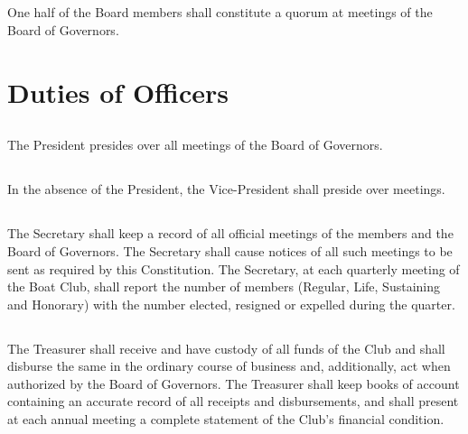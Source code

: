 \documentclass[11pt,american,letterpaper,]{constitution}
\begin{document}
\subsection[Quorum]{} 

One half of the Board members shall constitute a quorum at meetings of the Board of Governors.

\section{Duties of Officers}

\subsection[President]{} 

The President presides over all meetings of the Board of Governors.

\subsection[Vice President]{} 

In the absence of the President, the Vice-President shall preside over meetings.

\subsection[Secretary]{} 

The Secretary shall keep a record of all official meetings of the members and the Board of Governors. The Secretary shall cause notices of all such meetings to be sent as required by this Constitution. The Secretary, at each quarterly meeting of the Boat Club, shall report the number of members (Regular, Life, Sustaining and Honorary) with the number elected, resigned or expelled during the quarter.

\subsection[Treasurer]{} 

The Treasurer shall receive and have custody of all funds of the Club and shall disburse the same in the ordinary course of business and, additionally, act when authorized by the Board of Governors. The Treasurer shall keep books of account containing an accurate record of all receipts and disbursements, and shall present at each annual meeting a complete statement of the Club's financial condition.
\end{document}
